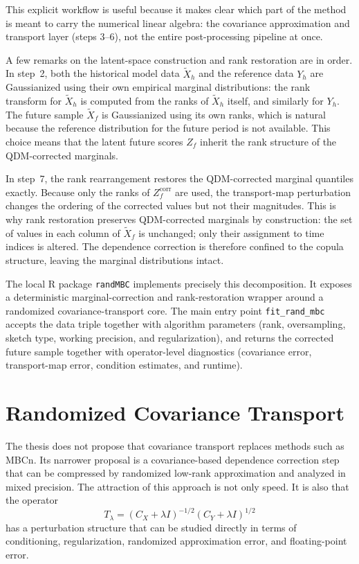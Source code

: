 This explicit workflow is useful because it makes clear which part of the method is
meant to carry the numerical linear algebra: the covariance approximation and
transport layer (steps 3--6), not the entire post-processing pipeline at once.

A few remarks on the latent-space construction and rank restoration are in order.
In step~2, both the historical model data \(\widetilde X_h\) and the reference data
\(Y_h\) are Gaussianized using their own empirical marginal distributions: the
rank transform for \(\widetilde X_h\) is computed from the ranks of
\(\widetilde X_h\) itself, and similarly for \(Y_h\). The future sample
\(\widetilde X_f\) is Gaussianized using its own ranks, which is natural because
the reference distribution for the future period is not available. This choice
means that the latent future scores \(Z_f\) inherit the rank structure of the
QDM-corrected marginals.

In step~7, the rank rearrangement restores the QDM-corrected marginal quantiles
exactly. Because only the ranks of \(Z_f^{\mathrm{corr}}\) are used, the
transport-map perturbation changes the ordering of the corrected values but not
their magnitudes. This is why rank restoration preserves QDM-corrected marginals
by construction: the set of values in each column of \(\widetilde X_f\) is
unchanged; only their assignment to time indices is altered. The dependence
correction is therefore confined to the copula structure, leaving the marginal
distributions intact.

The local R package \texttt{randMBC} implements precisely this decomposition. It
exposes a deterministic marginal-correction and rank-restoration wrapper around a
randomized covariance-transport core. The main entry point
\texttt{fit\_rand\_mbc} accepts the data triple together with algorithm parameters
(rank, oversampling, sketch type, working precision, and regularization), and
returns the corrected future sample together with operator-level diagnostics
(covariance error, transport-map error, condition estimates, and runtime).

\section{Randomized Covariance Transport}

The thesis does not propose that covariance transport replaces methods such as MBCn.
Its narrower proposal is a covariance-based dependence correction step that can be
compressed by randomized low-rank approximation and analyzed in mixed precision.
The attraction of this approach is not only speed. It is also that the operator
\[
	T_\lambda = (C_X + \lambda I)^{-1/2}(C_Y + \lambda I)^{1/2}
\]
has a perturbation structure that can be studied directly in terms of conditioning,
regularization, randomized approximation error, and floating-point error.

